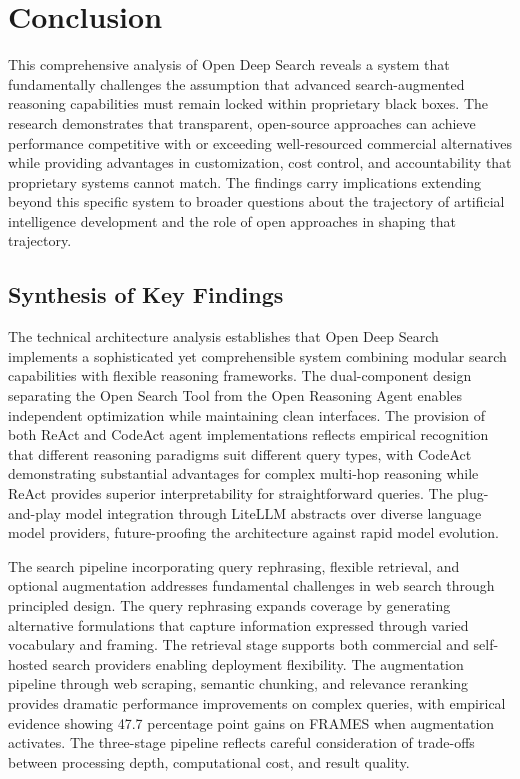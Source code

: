 \section{Conclusion}

This comprehensive analysis of Open Deep Search reveals a system that fundamentally challenges the assumption that advanced search-augmented reasoning capabilities must remain locked within proprietary black boxes. The research demonstrates that transparent, open-source approaches can achieve performance competitive with or exceeding well-resourced commercial alternatives while providing advantages in customization, cost control, and accountability that proprietary systems cannot match. The findings carry implications extending beyond this specific system to broader questions about the trajectory of artificial intelligence development and the role of open approaches in shaping that trajectory.

\subsection{Synthesis of Key Findings}

The technical architecture analysis establishes that Open Deep Search implements a sophisticated yet comprehensible system combining modular search capabilities with flexible reasoning frameworks. The dual-component design separating the Open Search Tool from the Open Reasoning Agent enables independent optimization while maintaining clean interfaces. The provision of both ReAct and CodeAct agent implementations reflects empirical recognition that different reasoning paradigms suit different query types, with CodeAct demonstrating substantial advantages for complex multi-hop reasoning while ReAct provides superior interpretability for straightforward queries. The plug-and-play model integration through LiteLLM abstracts over diverse language model providers, future-proofing the architecture against rapid model evolution.

The search pipeline incorporating query rephrasing, flexible retrieval, and optional augmentation addresses fundamental challenges in web search through principled design. The query rephrasing expands coverage by generating alternative formulations that capture information expressed through varied vocabulary and framing. The retrieval stage supports both commercial and self-hosted search providers enabling deployment flexibility. The augmentation pipeline through web scraping, semantic chunking, and relevance reranking provides dramatic performance improvements on complex queries, with empirical evidence showing 47.7 percentage point gains on FRAMES when augmentation activates. The three-stage pipeline reflects careful consideration of trade-offs between processing depth, computational cost, and result quality.

